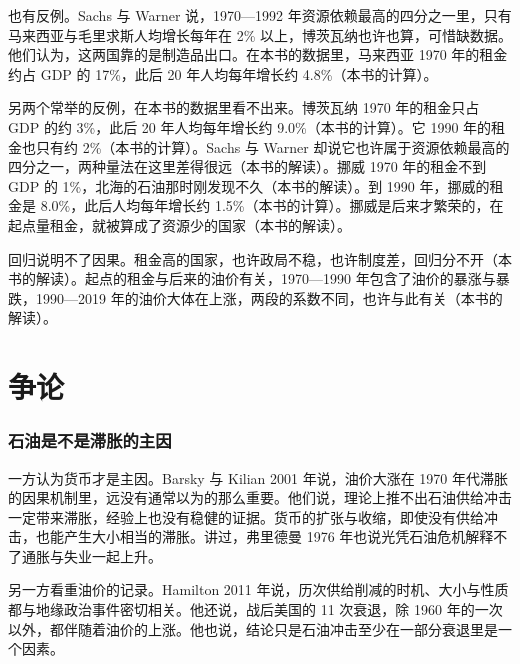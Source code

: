 
也有反例。Sachs 与 Warner 说，1970—1992 年资源依赖最高的四分之一里，只有马来西亚与毛里求斯人均增长每年在 2\% 以上，博茨瓦纳也许也算，可惜缺数据\cite{sachswarner1995}。他们认为，这两国靠的是制造品出口\cite{sachswarner1995}。在本书的数据里，马来西亚 1970 年的租金约占 GDP 的 17\%，此后 20 年人均每年增长约 4.8\%（本书的计算）。

另两个常举的反例，在本书的数据里看不出来。博茨瓦纳 1970 年的租金只占 GDP 的约 3\%，此后 20 年人均每年增长约 9.0\%（本书的计算）。它 1990 年的租金也只有约 2\%（本书的计算）。Sachs 与 Warner 却说它也许属于资源依赖最高的四分之一，两种量法在这里差得很远（本书的解读）。挪威 1970 年的租金不到 GDP 的 1\%，北海的石油那时刚发现不久（本书的解读）。到 1990 年，挪威的租金是 8.0\%，此后人均每年增长约 1.5\%（本书的计算）。挪威是后来才繁荣的，在起点量租金，就被算成了资源少的国家（本书的解读）。

回归说明不了因果。租金高的国家，也许政局不稳，也许制度差，回归分不开（本书的解读）。起点的租金与后来的油价有关，1970—1990 年包含了油价的暴涨与暴跌，1990—2019 年的油价大体在上涨，两段的系数不同，也许与此有关（本书的解读）。

\section{争论}\label{sec:oil-debate}

\subsubsection{石油是不是滞胀的主因}

一方认为货币才是主因。Barsky 与 Kilian 2001 年说，油价大涨在 1970 年代滞胀的因果机制里，远没有通常以为的那么重要\cite{barskykilian2001}。他们说，理论上推不出石油供给冲击一定带来滞胀，经验上也没有稳健的证据\cite{barskykilian2001}。货币的扩张与收缩，即使没有供给冲击，也能产生大小相当的滞胀\cite{barskykilian2001}。讲过，弗里德曼 1976 年也说光凭石油危机解释不了通胀与失业一起上升。

另一方看重油价的记录。Hamilton 2011 年说，历次供给削减的时机、大小与性质都与地缘政治事件密切相关\cite{hamilton2011}。他还说，战后美国的 11 次衰退，除 1960 年的一次以外，都伴随着油价的上涨\cite{hamilton2011}。他也说，结论只是石油冲击至少在一部分衰退里是一个因素\cite{hamilton2011}。

